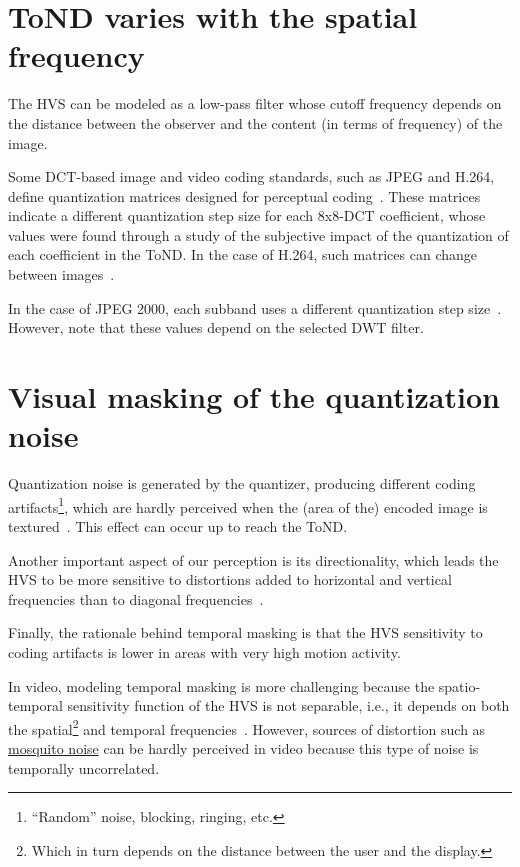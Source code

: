 \section{ToND varies with the spatial frequency}
The HVS can be modeled as a low-pass filter whose cutoff frequency
depends on the distance between the observer and the content (in terms
of frequency) of the image.

Some DCT-based image and video coding standards, such as JPEG and
H.264, define quantization matrices designed for perceptual
coding~\cite{ernawan2014optimal}. These matrices indicate a different
quantization step size for each 8x8-DCT coefficient, whose values were
found through a study of the subjective impact of the quantization of
each coefficient in the ToND. In the case of H.264, such matrices can
change between images~\cite{naccari2014perceptually}.

In the case of JPEG 2000, each subband uses a different quantization
step size~\cite{liu2020visibility}. However, note that these values
depend on the selected DWT filter.

\section{Visual masking of the quantization noise}

Quantization noise is generated by the quantizer, producing
different coding artifacts\footnote{``Random'' noise, blocking,
  ringing, etc.}, which are hardly perceived when the (area of the)
encoded image is textured~\cite{wu2017digital}. This effect can
occur up to reach the ToND.

Another important aspect of our perception is its directionality,
which leads the HVS to be more sensitive to distortions added to
horizontal and vertical frequencies than to diagonal
frequencies~\cite{naccari2014perceptually}.

Finally, the rationale behind temporal masking is that the HVS
sensitivity to coding artifacts is lower in areas with very high
motion activity.

In video, modeling temporal masking is more challenging because the
spatio-temporal sensitivity function of the HVS is not separable,
i.e., it depends on both the spatial\footnote{Which in turn depends on
  the distance between the user and the display.} and temporal
frequencies~\cite{naccari2014perceptually}. However, sources of
distortion such as
\href{https://en.wikipedia.org/wiki/Compression_artifact#Mosquito_noise}{mosquito
  noise} can be hardly perceived in video because this type of noise
is temporally uncorrelated.

